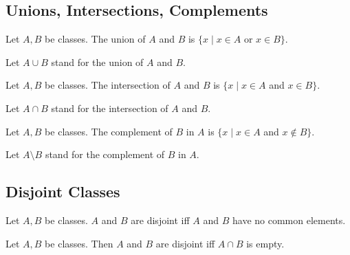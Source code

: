 \documentclass[10pt]{article}
\begin{document}
  \subsection*{Unions, Intersections, Complements}

  \begin{forthel}
    \begin{definition}
      Let $A, B$ be classes.
      The union of $A$ and $B$ is $\{ x \mid x \in A$ or $x \in B \}$.
    \end{definition}

    Let $A \cup B$ stand for the union of $A$ and $B$.
  \end{forthel}

  \begin{forthel}
    \begin{definition}
      Let $A, B$ be classes.
      The intersection of $A$ and $B$ is $\{ x \mid x \in A$ and $x \in B \}$.
    \end{definition}

    Let $A \cap B$ stand for the intersection of $A$ and $B$.
  \end{forthel}

  \begin{forthel}
    \begin{definition}
      Let $A, B$ be classes.
      The complement of $B$ in $A$ is $\{ x \mid x \in A$ and $x \notin B \}$.
    \end{definition}

    Let $A \setminus B$ stand for the complement of $B$ in $A$.
  \end{forthel}


  \subsection*{Disjoint Classes}

  \begin{forthel}
    \begin{definition}
      Let $A, B$ be classes.
      $A$ and $B$ are disjoint iff $A$ and $B$ have no common elements.
    \end{definition}
  \end{forthel}

  \begin{forthel}
    \begin{proposition}
      Let $A, B$ be classes.
      Then $A$ and $B$ are disjoint iff $A \cap B$ is empty.
    \end{proposition}
  \end{forthel}
\end{document}
